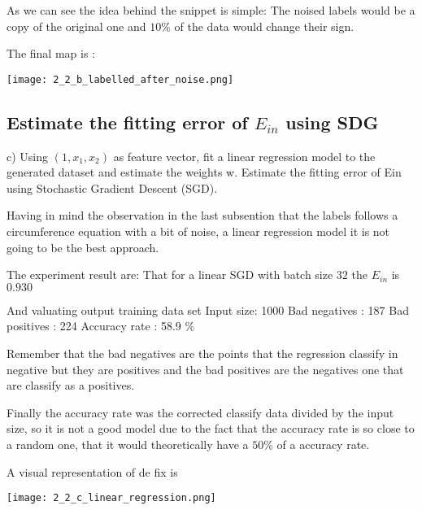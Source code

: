   As we can see the idea behind the snippet is simple: The noised labels would be a copy of the original one and $10\%$ of the data would change their sign.

  The final map is :


  \texttt{[image: 2\_2\_b\_labelled\_after\_noise.png]}
  

  \subsection{ Estimate the fitting error of $E_{in}$ using SDG}

  c) Using $(1, x_1, x_2)$ as feature vector, fit a linear regression model to the generated dataset and estimate the weights w. Estimate the fitting error of Ein using Stochastic Gradient Descent (SGD).

  Having in mind the observation in the last subsention that the labels follows a circumference equation with a bit of noise, a linear regression model it is not going to be the best approach.

  The experiment result are:
That for a linear SGD with batch size $32$ the $E_{in}$ is   $0.930$

And valuating output training data set
Input size:  1000
Bad negatives : 187
Bad positives : 224
Accuracy rate : 58.9 \%


Remember that the bad negatives are the points that the regression classify in negative but they are positives and the bad positives are the negatives one that are classify as a positives.

Finally the accuracy rate was the corrected classify data divided by the input size, so it is not a good model due to the fact that the accuracy rate is so close to a random one, that it would theoretically have a $50\%$ of a accuracy rate.

A visual representation of de fix is


\texttt{[image: 2\_2\_c\_linear\_regression.png]}

